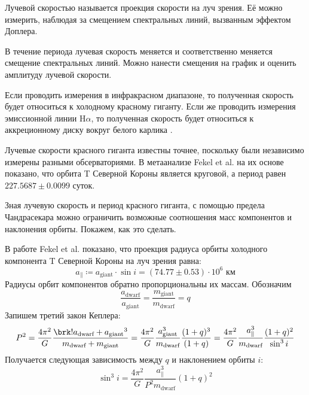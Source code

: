 
Лучевой скоростью называется проекция скорости на луч зрения. Её можно измерить, наблюдая за смещением спектральных линий, вызванным эффектом Доплера.

В течение периода лучевая скорость меняется и соответственно меняется смещение спектральных линий. Можно нанести смещения на график и оценить амплитуду лучевой скорости.

Если проводить измерения в инфракрасном диапазоне, то полученная скорость будет относиться к холодному красному гиганту. Если же проводить измерения эмиссионной линии H$\alpha$, то полученная скорость будет относиться к аккреционному диску вокруг белого карлика \cite{H_alpha}.


Лучевые скорости красного гиганта известны точнее, поскольку были независимо измерены разными обсерваториями. В метаанализе Fekel et al. \cite{RadialVelocities} на их основе показано, что орбита T Северной Короны является круговой, а период равен $227.5687 \pm 0.0099$ суток.

\label{sect:Chandrasekhar}

Зная лучевую скорость и период красного гиганта, с помощью предела Чандрасекара можно ограничить возможные соотношения масс компонентов и наклонения орбиты. Покажем, как это сделать.

В работе Fekel et al. \cite{RadialVelocities} показано, что проекция радиуса орбиты холодного компонента T Северной Короны на луч зрения равна:
\[
a_\| \coloneq a_\text{giant} \cdot \sin i = (74.77 \pm 0.53) \cdot 10^6 \text{ км}
\]
%
%
Радиусы орбит компонентов обратно пропорциональны их массам. Обозначим
\[
\frac{a_\text{dwarf}}{a_\text{giant}} = \frac{m_\text{giant}}{m_\text{dwarf}} = q
\]
Запишем третий закон Кеплера:
\[
P^2 = \frac{4\pi^2}{G} \frac{\brk!{a_\text{dwarf} + a_\text{giant}}^3}{m_\text{dwarf} + m_\text{giant}}
= \frac{4\pi^2}{G} \frac{a_\text{giant}^3}{m_\text{dwarf}} \frac{(1 + q)^3}{(1 + q)}
= \frac{4\pi^2}{G} \frac{a_\|^3}{m_\text{dwarf}} \frac{(1 + q)^2}{\sin^3 i}
\]
Получается следующая зависимость между $q$ и наклонением орбиты $i$:
\[
\sin^3 i = \frac{4\pi^2}{G} \frac{a_\|^3}{P^2 m_\text{dwarf}} (1 + q)^2
\]

